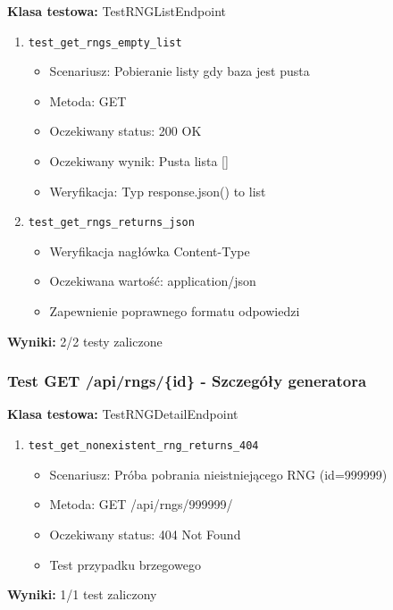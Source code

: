 \documentclass[12pt,a4paper]{article}
\begin{document}
\textbf{Klasa testowa:} TestRNGListEndpoint

\begin{enumerate}
    \item \texttt{test\_get\_rngs\_empty\_list}
    \begin{itemize}
        \item Scenariusz: Pobieranie listy gdy baza jest pusta
        \item Metoda: GET
        \item Oczekiwany status: 200 OK
        \item Oczekiwany wynik: Pusta lista []
        \item Weryfikacja: Typ response.json() to list
    \end{itemize}
    
    \item \texttt{test\_get\_rngs\_returns\_json}
    \begin{itemize}
        \item Weryfikacja nagłówka Content-Type
        \item Oczekiwana wartość: application/json
        \item Zapewnienie poprawnego formatu odpowiedzi
    \end{itemize}
\end{enumerate}

\textbf{Wyniki:} 2/2 testy zaliczone

\subsubsection{Test GET /api/rngs/\{id\} - Szczegóły generatora}

\textbf{Klasa testowa:} TestRNGDetailEndpoint

\begin{enumerate}
    \item \texttt{test\_get\_nonexistent\_rng\_returns\_404}
    \begin{itemize}
        \item Scenariusz: Próba pobrania nieistniejącego RNG (id=999999)
        \item Metoda: GET /api/rngs/999999/
        \item Oczekiwany status: 404 Not Found
        \item Test przypadku brzegowego
    \end{itemize}
\end{enumerate}

\textbf{Wyniki:} 1/1 test zaliczony
\end{document}
